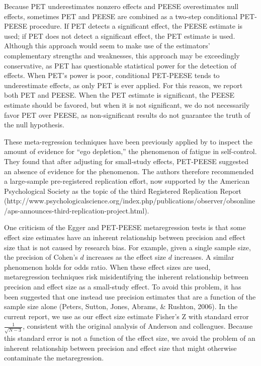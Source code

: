 \documentclass[man]{apa6}
\begin{document}
Because PET underestimates nonzero effects and PEESE overestimates null effects, sometimes PET and PEESE are combined as a two-step conditional PET-PEESE procedure. If PET detects a significant effect, the PEESE estimate is used; if PET does not detect a significant effect, the PET estimate is used. Although this approach would seem to make use of the estimators' complementary strengths and weaknesses, this approach may be exceedingly conservative, as PET has questionable statistical power for the detection of effects. When PET's power is poor, conditional PET-PEESE tends to underestimate effects, as only PET is ever applied. For this reason, we report both PET and PEESE. When the PET estimate is significant, the PEESE estimate should be favored, but when it is not significant, we do not necessarily favor PET over PEESE, as non-significant results do not guarantee the truth of the null hypothesis.

These meta-regression techniques have been previously applied by \citet{Carter:McCullough:2014} to inspect the amount of evidence for ``ego depletion,'' the phenomenon of fatigue in self-control. They found that after adjusting for small-study effects, PET-PEESE suggested an absence of evidence for the phenomenon. The authors therefore recommended a large-sample pre-registered replication effort, now supported by the American Psychological Society as the topic of the third Registered Replication Report (http://www.psychologicalscience.org/index.php/publications/observer/obsonline/aps-announces-third-replication-project.html).

One criticism of the Egger and PET-PEESE metaregression tests is that some effect size estimates have an inherent relationship between precision and effect size that is not caused by research bias. For example, given a single sample size, the precision of Cohen's $d$ increases as the effect size $d$ increases. A similar phenomenon holds for odds ratio. When these effect sizes are used, metaregression techniques risk misidentifying the inherent relationship between precision and effect size as a small-study effect. To avoid this problem, it has been suggested that one instead use precision estimates that are a function of the sample size alone (Peters, Sutton, Jones, Abrams, \& Rushton, 2006). In the current report, we use as our effect size estimate Fisher's Z with standard error $\frac{1}{\sqrt{N-3}}$, consistent with the original analysis of Anderson and colleagues. Because this standard error is not a function of the effect size, we avoid the problem of an inherent relationship between precision and effect size that might otherwise contaminate the metaregression.
\end{document}
